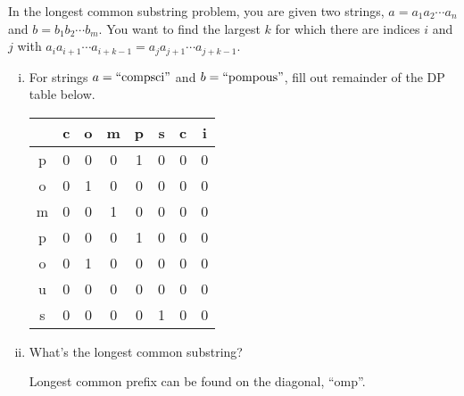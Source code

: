 \documentclass[11pt]{article}
\begin{document}
\begin{subparts}
    \subpart In the longest common substring problem, you are given two strings, $a = a_1a_2 \cdots a_n$ and $b = b_1b_2 \cdots b_m$. You want to find the largest $k$ for which there are indices $i$ and $j$ with $a_ia_{i + 1} \cdots a_{i + k - 1} = a_ja_{j + 1} \cdots a_{j + k - 1}$. 

    \begin{enumerate}[(i)]
    
        \item For strings $a = ``\text{compsci}"$ and $b = ``\text{pompous}"$, fill out remainder of the DP table below.

        \begin{center}

        \begin{tabular}{c|c|c|c|c|c|c|c}
            \hline
            \hline
             & c & o & m & p & s & c & i \\
            \hline
            p & \color{blue}0\color{black} & \color{blue}0\color{black} & \color{blue}0\color{black} & \color{blue}1\color{black} & 0 & 0 & 0 \\
            \hline
            o & \color{blue}0\color{black} & \color{blue}1\color{black} & \color{blue}0\color{black} & \color{blue}0\color{black} & 0 & 0 & 0 \\
            \hline
            m & \color{blue}0\color{black} & \color{blue}0\color{black} & \color{blue}1\color{black} & \color{blue}0\color{black} & 0 & 0 & 0 \\
            \hline
            p & 0 & 0 & 0 & \color{blue}1\color{black} & 0 & 0 & 0 \\
            \hline
            o & 0 & 1 & 0 & 0 & \color{blue}0\color{black} & \color{blue}0\color{black} & \color{blue}0\color{black} \\
            \hline
            u & 0 & 0 & 0 & 0 & \color{blue}0\color{black} & \color{blue}0\color{black} & \color{blue}0\color{black} \\
            \hline
            s & 0 & 0 & 0 & 0 & \color{blue}1\color{black} & \color{blue}0\color{black} & \color{blue}0\color{black} \\
            \hline
            \hline
        \end{tabular}

        \end{center}

        \item What's the longest common substring?\\
        \begin{solution}
            Longest common prefix can be found on the diagonal, ``omp''.
        \end{solution}
    \end{enumerate}


\end{subparts}
\end{document}
